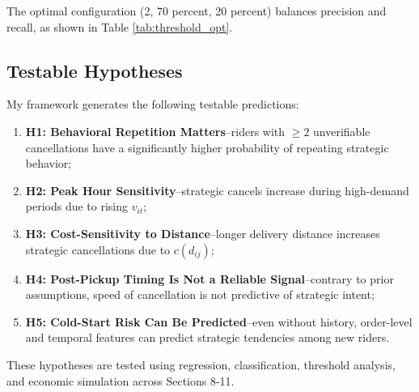 The optimal configuration (2, 70 percent, 20 percent) balances precision and recall, as shown in Table \ref{tab:threshold_opt}.

\subsection{Testable Hypotheses}

My framework generates the following testable predictions:

\begin{enumerate}
    \item \textbf{H1: Behavioral Repetition Matters}--riders with $\geq 2$ unverifiable cancellations have a significantly higher probability of repeating strategic behavior;
    \item \textbf{H2: Peak Hour Sensitivity}--strategic cancels increase during high-demand periods due to rising $v_{it}$;
    \item \textbf{H3: Cost-Sensitivity to Distance}--longer delivery distance increases strategic cancellations due to $c(d_{ij})$;
    \item \textbf{H4: Post-Pickup Timing Is Not a Reliable Signal}--contrary to prior assumptions, speed of cancellation is not predictive of strategic intent;
    \item \textbf{H5: Cold-Start Risk Can Be Predicted}--even without history, order-level and temporal features can predict strategic tendencies among new riders.
\end{enumerate}

These hypotheses are tested using regression, classification, threshold analysis, and economic simulation across Sections 8-11.